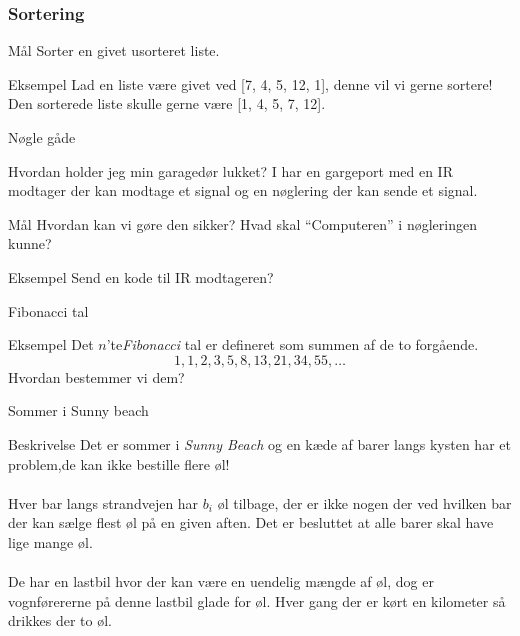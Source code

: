 \documentclass[12pt,t]{beamer}
\begin{document}
    \begin{frame}
      \frametitle{Sortering}
      \begin{block}{Mål}
          Sorter en givet usorteret liste.
      \end{block}
      \pause

      \begin{exampleblock}{Eksempel}
      Lad en liste være givet ved [7, 4, 5, 12, 1], denne vil vi gerne sortere!
      Den sorterede liste skulle gerne være [1, 4, 5, 7, 12].
      \end{exampleblock}
    \end{frame}


    \begin{frame}{Nøgle gåde}
    \begin{block}{Hvordan holder jeg min garagedør lukket?}
        I har en gargeport med en IR modtager der kan modtage et
        signal og en nøglering der kan sende et signal.
    \end{block}\pause
      \begin{block}{Mål}
        Hvordan kan vi gøre den sikker? Hvad skal ``Computeren'' i
        nøgleringen kunne?
      \end{block}
      \pause
      \begin{exampleblock}{Eksempel}
        Send en kode til IR modtageren?
      \end{exampleblock}
    \end{frame}


    \begin{frame}[c]{Fibonacci tal}
        \begin{block}{Eksempel}
            Det $n$'te\emph{Fibonacci} tal er defineret som summen af de to
            forgående.
            $$
              1,1,2,3,5,8,13,21,34,55, \dots
            $$
            \pause
            Hvordan bestemmer vi dem?
        \end{block}
    \end{frame}

\begin{frame}[c]{Sommer i Sunny beach}
    \begin{block}{Beskrivelse}
      Det er sommer i \emph{Sunny Beach} og en kæde af barer langs kysten
      har et problem,\pause  de kan ikke bestille flere øl!
      \\
      \pause  ~ \\
      Hver bar langs strandvejen har $b_i$ øl tilbage, der er ikke
      nogen der ved hvilken bar der kan sælge flest øl på en given aften.
      \pause
      Det er besluttet at alle barer skal have lige mange øl. \\
      \pause
      ~\\
      De har en lastbil hvor der kan være en uendelig mængde af øl, \pause
      dog er vognførererne på denne lastbil glade for øl. Hver gang der er
      kørt en kilometer så drikkes der to øl.
    \end{block}
\end{frame}
\end{document}
